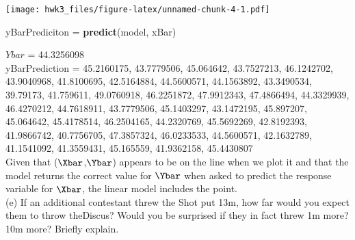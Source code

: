\documentclass[
]{article}
\newenvironment{Shaded}{\begin{snugshade}}{\end{snugshade}}
\newcommand{\KeywordTok}[1]{\textcolor[rgb]{0.13,0.29,0.53}{\textbf{#1}}}
\newcommand{\NormalTok}[1]{#1}
\newcommand{\StringTok}[1]{\textcolor[rgb]{0.31,0.60,0.02}{#1}}
\begin{document}
\texttt{[image: hwk3\_files/figure-latex/unnamed-chunk-4-1.pdf]}

\begin{Shaded}
\begin{Highlighting}[]
\NormalTok{yBarPrediciton =}\StringTok{ }\KeywordTok{predict}\NormalTok{(model, xBar) }
\end{Highlighting}
\end{Shaded}

\(Ybar\) = 44.3256098\\
yBarPrediction = 45.2160175, 43.7779506, 45.064642, 43.7527213,
46.1242702, 43.9040968, 41.8100695, 42.5164884, 44.5600571, 44.1563892,
43.3490534, 39.79173, 41.759611, 49.0760918, 46.2251872, 47.9912343,
47.4866494, 44.3329939, 46.4270212, 44.7618911, 43.7779506, 45.1403297,
43.1472195, 45.897207, 45.064642, 45.4178514, 46.2504165, 44.2320769,
45.5692269, 42.8192393, 41.9866742, 40.7756705, 47.3857324, 46.0233533,
44.5600571, 42.1632789, 41.1541092, 41.3559431, 45.165559, 41.9362158,
45.4430807\\
Given that (\(\Xbar\),\(\Ybar\)) appears to be on the line when we plot
it and that the model returns the correct value for \(\Ybar\) when asked
to predict the response variable for \(\Xbar\), the linear model
includes the point.\\
(e) If an additional contestant threw the Shot put 13m, how far would
you expect them to throw theDiscus? Would you be surprised if they in
fact threw 1m more? 10m more? Briefly explain.
\end{document}
